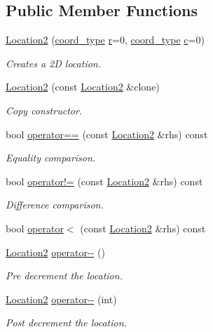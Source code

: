 \subsection*{Public Member Functions}
\begin{DoxyCompactItemize}
\item 
\mbox{\hyperlink{structlife_1_1_location2_a936ccf640d934f1b493626b3c64e3cb9}{Location2}} (\mbox{\hyperlink{structlife_1_1_location2_abad0c81db789cf9a9f4396ac0c0ef06b}{coord\+\_\+type}} \mbox{\hyperlink{structlife_1_1_location2_a30da62b5cddae401fdbc16546cf8806e}{r}}=0, \mbox{\hyperlink{structlife_1_1_location2_abad0c81db789cf9a9f4396ac0c0ef06b}{coord\+\_\+type}} \mbox{\hyperlink{structlife_1_1_location2_a00720fe856afcb622f5393ba72770a5c}{c}}=0)
\begin{DoxyCompactList}\small\item\em Creates a 2D location. \end{DoxyCompactList}\item 
\mbox{\hyperlink{structlife_1_1_location2_a41c5bb5f81eb5b9325b4a65fc1bb920e}{Location2}} (const \mbox{\hyperlink{structlife_1_1_location2}{Location2}} \&clone)
\begin{DoxyCompactList}\small\item\em Copy constructor. \end{DoxyCompactList}\item 
bool \mbox{\hyperlink{structlife_1_1_location2_a73176a88dbec1ec8936f029eeeab2ff3}{operator==}} (const \mbox{\hyperlink{structlife_1_1_location2}{Location2}} \&rhs) const
\begin{DoxyCompactList}\small\item\em Equality comparison. \end{DoxyCompactList}\item 
bool \mbox{\hyperlink{structlife_1_1_location2_a0d1d962a97ac56846457d4522b99145b}{operator!=}} (const \mbox{\hyperlink{structlife_1_1_location2}{Location2}} \&rhs) const
\begin{DoxyCompactList}\small\item\em Difference comparison. \end{DoxyCompactList}\item 
bool \mbox{\hyperlink{structlife_1_1_location2_a7b2c75c69ca74555939fed80c3b1843f}{operator$<$}} (const \mbox{\hyperlink{structlife_1_1_location2}{Location2}} \&rhs) const
\item 
\mbox{\hyperlink{structlife_1_1_location2}{Location2}} \mbox{\hyperlink{structlife_1_1_location2_a99b18978b599ed362f963c7ef93d367d}{operator-\/-\/}} ()
\begin{DoxyCompactList}\small\item\em Pre decrement the location. \end{DoxyCompactList}\item 
\mbox{\hyperlink{structlife_1_1_location2}{Location2}} \mbox{\hyperlink{structlife_1_1_location2_a76feea4cb55bafbc6ca9ac84f032aea7}{operator-\/-\/}} (int)
\begin{DoxyCompactList}\small\item\em Post decrement the location. \end{DoxyCompactList}\end{DoxyCompactItemize}
